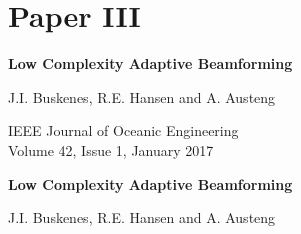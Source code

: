 
\endofdump



\ifRootBuild\else
  
  \makeglossaries
  
  
\fi

\newif\ifBuildBibliography\BuildBibliographyfalse

{}






\graphicspath{{../LCAforActiveSonarImaging/submission/final/}}

% 
\cleardoublepage
\pagestyle{empty}

{
\setlength\parskip{\baselineskip}
\renewcommand\baselinestretch{1.1}

\chapter{Paper III}\label{ch:paperIII}

{\Large\bf Low Complexity Adaptive Beamforming}

J.I. Buskenes, R.E. Hansen and A. Austeng

IEEE Journal of Oceanic Engineering\\
Volume 42, Issue 1, January 2017%
}


\cleardoublepage
\pagestyle{normal}
\thispagestyle{plain}

\begin{center}
{\Large\bf Low Complexity Adaptive Beamforming}

\vspace{\baselineskip}
J.I. Buskenes, R.E. Hansen and A. Austeng
\end{center}

\overfullrule=1mm
{

   
}
   
% 
% 
%    


